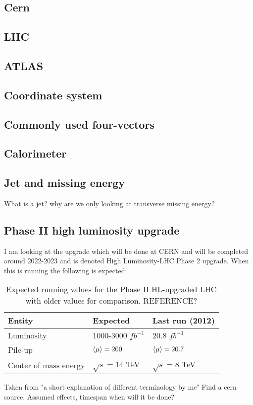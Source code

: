\subsection{Cern}
\subsection{LHC}
\subsection{ATLAS}
\subsection{Coordinate system}
\subsection{Commonly used four-vectors}
\subsection{Calorimeter}
\subsection{Jet and missing energy}
What is a jet? why are we only looking at transverse missing energy? 
\subsection{Phase II high luminosity upgrade}
I am looking at the upgrade which will be done at CERN and will be completed around 2022-2023 and is denoted High Luminosity-LHC Phase 2 upgrade. When this is running the following is expected:
\begin{table}[H]
\begin{center}
    \begin{tabular}{ | l | l | l |}
    \hline
    Entity & Expected & Last run (2012) \\ \hline
  	Luminosity & 1000-3000 $fb^{-1}$ & 20.8 $fb^{-1}$ \\ \hline
  	Pile-up & $\left<\mu\right>=200$ & $\left<\mu\right>=20.7$ \\ \hline
  	Center of mass energy & $\sqrt{s}=14$ TeV &  $\sqrt{s}=8$ TeV \\ \hline
  	\end{tabular}
  	\end{center}
  	\caption{Expected running values for the Phase II HL-upgraded LHC with older values for comparison. REFERENCE?}
    \end{table}
Taken from "a short explanation of different terminology by me" Find a cern source.
Assumed effects, timespan when will it be done?
